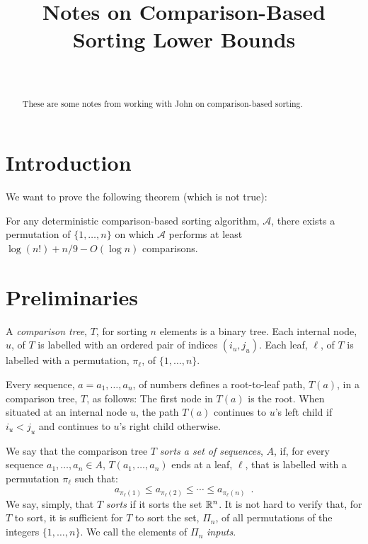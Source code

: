 \documentclass{patmorin}
\title{Notes on Comparison-Based Sorting Lower Bounds}
\author{\ }
\begin{document}
\maketitle

\begin{abstract}
These are some notes from working with John on comparison-based sorting.
\end{abstract}

\section{Introduction}

We want to prove the following theorem (which is not true):

\begin{thm}
  For any deterministic comparison-based sorting algorithm, $\mathcal{A}$,
  there exists a permutation of $\{1,\ldots,n\}$ on which $\mathcal{A}$
  performs at least $\log(n!)+n/9-O(\log n)$ comparisons.
\end{thm}

\section{Preliminaries}

A \emph{comparison tree}, $T$, for sorting $n$ elements is a binary tree.
Each internal node, $u$, of $T$ is labelled with an ordered pair of
indices $(i_u,j_u)$.  Each leaf, $\ell$, of $T$ is labelled with a
permutation, $\pi_\ell$, of $\{1,\ldots,n\}$.

Every sequence, $a=a_1,\ldots,a_n$, of numbers defines a root-to-leaf
path, $T(a)$, in a comparison tree, $T$, as follows:  The first node
in $T(a)$ is the root.  When situated at an internal node $u$, the path
$T(a)$ continues to $u$'s left child if $i_u < j_u$ and continues to
$u$'s right child otherwise.

We say that the comparison tree $T$ \emph{sorts a set of sequences}, $A$,
if, for every sequence $a_1,\ldots,a_n\in A$, $T(a_1,\ldots,a_n)$ ends at
a leaf, $\ell$, that is labelled with a permutation $\pi_\ell$ such that:
\[
    a_{\pi_\ell(1)} \le a_{\pi_\ell(2)} 
        \le \cdots \le a_{\pi_\ell(n)} \enspace .
\]
We say, simply, that $T$ \emph{sorts} if it sorts the set $\mathbb{R}^n$.  It is
not hard to verify that, for $T$ to sort, it is sufficient for $T$ to sort
the set, $\Pi_n$, of all permutations of the integers $\{1,\ldots,n\}$. We call the elements of $\Pi_n$ \emph{inputs}.
\end{document}
